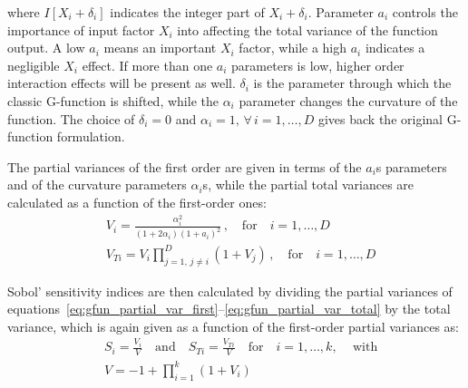 \vspace{0.2cm}\noindent
where $I[X_i+\delta_i]$ indicates the integer part of $X_i+\delta_i$. Parameter $a_i$ controls the importance of input factor $X_i$ into affecting the total variance of the function output. A low $a_i$ means an important $X_i$ factor, while a high $a_i$ indicates a negligible $X_i$ effect. If more than one $a_i$ parameters is low, higher order interaction effects will be present as well. $\delta_i$ is the parameter through which the classic G-function is shifted, while the $\alpha_i$ parameter changes the curvature of the function. The choice of $\delta_i=0$ and $\alpha_i=1,\,\forall\,i=1,\dots,D$ gives back the original G-function formulation.

\vspace{0.2cm}
The partial variances of the first order are given in terms of the $a_i$s parameters and of the curvature parameters $\alpha_i$s, while the partial total variances are calculated as a function of the first-order ones:
%
\begin{align}
	& V_i = \frac{\alpha_i^2}{(1+2\alpha_i)(1 + a_i)^2}\,,\quad\text{for}\quad i=1,\dots,D \label{eq:gfun_partial_var_first}\\
	& V_{Ti} = V_i \prod_{j=1,\,j\neq i}^{D}(1 + V_j)\,,\quad\text{for}\quad i=1,\dots,D \label{eq:gfun_partial_var_total}
\end{align}

\vspace{0.2cm}\noindent
Sobol' sensitivity indices are then calculated by dividing the partial variances of equations~\eqref{eq:gfun_partial_var_first}--\eqref{eq:gfun_partial_var_total} by the total variance, which is again given as a function of the first-order partial variances as:
%
\begin{align}
	& S_i = \frac{V_i}{V} \quad\text{and}\quad S_{Ti} = \frac{V_{Ti}}{V} \quad\text{for}\quad i=1,\dots,k,\,\quad\text{with} \\
	& V = -1 + \prod_{i=1}^{k}(1 + V_i) 
\end{align}

%
%
%
